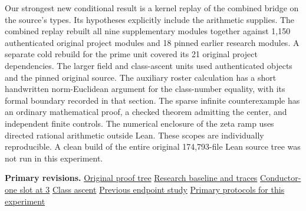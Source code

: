 \documentclass[12pt,letterpaper]{article}
\begin{document}
Our strongest new conditional result is a kernel replay of the combined bridge on the source's types. Its hypotheses explicitly include the arithmetic supplies. The combined replay rebuilt all nine supplementary modules together against 1,150 authenticated original project modules and 18 pinned earlier research modules. A separate cold rebuild for the prime unit covered its 21 original project dependencies. The larger field and class-ascent units used authenticated objects and the pinned original source. The auxiliary roster calculation has a short handwritten norm-Euclidean argument for the class-number equality, with its formal boundary recorded in that section. The sparse infinite counterexample has an ordinary mathematical proof, a checked theorem admitting the center, and independent finite controls. The numerical enclosure of the zeta ramp uses directed rational arithmetic outside Lean. These scopes are individually reproducible. A clean build of the entire original 174,793-file Lean source tree was not run in this experiment.

\medskip\textbf{Primary revisions.} \href{https://github.com/nousentllc/riemann-hypothesis/tree/40e56bab026552e089d7afcfeff08d2defb9c005}{Original proof tree}\quad
\href{https://github.com/nousentllc/riemann-hypothesis/tree/08188ff0c6dd02dfec0bd65d30765862e9db56b7/research/uriel}{Research baseline and traces}\quad
\href{https://github.com/nousentllc/riemann-hypothesis/tree/4b1c9fbbfb9bc50a3f791c2c1f3d7f2adb336c87/research/uriel/experiments/slot-three}{Conductor-one slot at 3}\quad
\href{https://github.com/nousentllc/riemann-hypothesis/tree/e674cb750ef96b2f5e7cd46586ea4edb9998715a/research/uriel/experiments/ascent-witness}{Class ascent}\quad
\href{https://github.com/nousentllc/riemann-hypothesis/tree/d79bd956c6fb2b8a3de51b606765be81d24fb1fc/research/uriel/experiments/cofinal-endpoint-certificates}{Previous endpoint study}\quad
\href{https://github.com/nousentllc/riemann-hypothesis/commit/2ddb0b1a35431324d62739d775c65f1b3f4df46b}{Primary protocols for this experiment}
\end{document}
